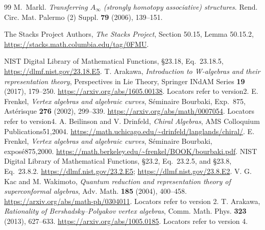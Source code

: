 \begin{thebibliography}{99}
M.~Markl.
\textit{Transferring $A_\infty$ (strongly homotopy associative)
structures}.
Rend. Circ. Mat. Palermo (2) Suppl. \textbf{79} (2006), 139--151.

The Stacks Project Authors, \emph{The Stacks Project},
Section 50.15, Lemma 50.15.2,
\url{https://stacks.math.columbia.edu/tag/0FMU}.

 NIST Digital Library of Mathematical Functions, \S23.18, Eq.~23.18.5, \url{https://dlmf.nist.gov/23.18.E5}.
 T. Arakawa, \emph{Introduction to W-algebras and their representation theory}, Perspectives in Lie Theory, Springer INdAM Series \textbf{19} (2017), 179--250. \url{https://arxiv.org/abs/1605.00138}. Locators refer to version2.
 E. Frenkel, \emph{Vertex algebras and algebraic curves}, S\'eminaire Bourbaki, Exp.~875, Ast\'erisque \textbf{276} (2002), 299--339. \url{https://arxiv.org/abs/math/0007054}. Locators refer to version4.
 A. Beilinson and V. Drinfeld, \emph{Chiral Algebras}, AMS Colloquium Publications51,2004. \url{https://math.uchicago.edu/~drinfeld/langlands/chiral/}.
 E. Frenkel, \emph{Vertex algebras and algebraic curves}, S\'eminaire Bourbaki, expos\'e875,2000. \url{https://math.berkeley.edu/~frenkel/BOOK/bourbaki.pdf}.
 NIST Digital Library of Mathematical Functions, \S23.2, Eq.~23.2.5, and \S23.8, Eq.~23.8.2. \url{https://dlmf.nist.gov/23.2.E5}; \url{https://dlmf.nist.gov/23.8.E2}.
 V. G. Kac and M. Wakimoto, \emph{Quantum reduction and representation theory of superconformal algebras}, Adv. Math. \textbf{185} (2004), 400--458. \url{https://arxiv.org/abs/math-ph/0304011}. Locators refer to version 2.
 T. Arakawa, \emph{Rationality of Bershadsky--Polyakov vertex algebras}, Comm. Math. Phys. \textbf{323} (2013), 627--633. \url{https://arxiv.org/abs/1005.0185}. Locators refer to version 4.
\end{thebibliography}
